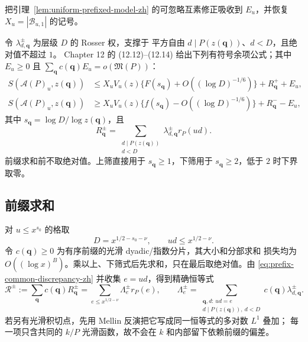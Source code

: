 \documentclass[UTF8,10pt,a4paper]{ctexart}
\newcommand{\Acal}{\mathcal{A}}
\newcommand{\Bcal}{\mathcal{B}}
\newcommand{\1}{\mathbf{1}}
\theoremstyle{remark}
\begin{document}
把引理~\ref{lem:uniform-prefixed-model-zh} 的可忽略互素修正吸收到 $E_u$，并恢复
$X_u=|\Bcal_{u,1}|$ 的记号。

令 $\lambda_{d,\boldsymbol q}^\pm$ 为层级 $D$ 的 Rosser 权，支撑于
平方自由 $d\mid P(z(\boldsymbol q))$、$d<D$，且绝对值不超过 $1$。
Chapter 12 的 (12.12)--(12.14) 给出下列有符号余项公式；其中 $E_u\ge0$ 且
$\sum_{\boldsymbol q}c(\boldsymbol q)E_u=o(\mathfrak M(P))$：
\begin{align*}
 S(\Acal(P)_u,z(\boldsymbol q))
 &\le X_uV_u(z)
 \{F(s_{\boldsymbol q})+O((\log D)^{-1/6})\}
 +R_{\boldsymbol q}^{+}+E_u,\\
 S(\Acal(P)_u,z(\boldsymbol q))
 &\ge X_uV_u(z)
 \{f(s_{\boldsymbol q})-O((\log D)^{-1/6})\}
 +R_{\boldsymbol q}^{-}-E_u,
\end{align*}
其中 $s_{\boldsymbol q}=\log D/\log z(\boldsymbol q)$，且
\[
 R_{\boldsymbol q}^{\pm}
 =\sum_{\substack{d\mid P(z(\boldsymbol q))\\d<D}}
 \lambda_{d,\boldsymbol q}^{\pm}r_P(ud).
\]
前缀求和前不取绝对值。上筛直接用于 $s_{\boldsymbol q}\ge1$，下筛用于
$s_{\boldsymbol q}\ge2$，低于 $2$ 时下界取零。

\subsection{前缀求和}
对 $u\le x^{s_0}$ 的格取
\[
 D=x^{1/2-s_0-\nu},\qquad ud\le x^{1/2-\nu}.
\]
令 $c(\boldsymbol q)\ge0$ 为有序前缀的光滑 dyadic/指数分片，其大小和分部求和
损失均为 $O((\log x)^B)$。乘以上、下筛式后先求和，只在最后取绝对值。由
\eqref{eq:prefix-common-discrepancy-zh} 并收集 $e=ud$，得到精确恒等式
\[
 \mathcal R^\pm
 :=\sum_{\boldsymbol q}c(\boldsymbol q)R_{\boldsymbol q}^{\pm}
 =\sum_{e\le x^{1/2-\nu}}\Lambda_e^\pm r_P(e),
 \qquad
 \Lambda_e^\pm
 =\sum_{\substack{\boldsymbol q,d:\,ud=e\\
                    d\mid P(z(\boldsymbol q)),\ d<D}}
 c(\boldsymbol q)\lambda_{d,\boldsymbol q}^\pm.
\]
若另有光滑积切点，先用 Mellin 反演把它写成同一恒等式的多对数 $L^1$ 叠加；
每一项只含共同的 $k/P$ 光滑函数，故不会在 $k$ 和内部留下依赖前缀的偏差。
\end{document}
